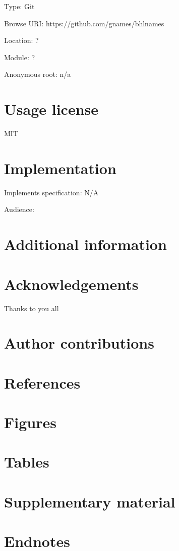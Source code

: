 \documentclass[
]{article}
\begin{document}
Type: Git

Browse URI: https://github.com/gnames/bhlnames

Location: ?

Module: ?

Anonymous root: n/a

\hypertarget{usage-license}{%
\section{Usage license}\label{usage-license}}

MIT

\hypertarget{implementation}{%
\section{Implementation}\label{implementation}}

Implements specification: N/A

Audience:

\hypertarget{additional-information}{%
\section{Additional information}\label{additional-information}}

\hypertarget{acknowledgements}{%
\section{Acknowledgements}\label{acknowledgements}}

Thanks to you all

\hypertarget{author-contributions}{%
\section{Author contributions}\label{author-contributions}}

\hypertarget{references}{%
\section{References}\label{references}}

\hypertarget{figures}{%
\section{Figures}\label{figures}}

\hypertarget{tables}{%
\section{Tables}\label{tables}}

\hypertarget{supplementary-material}{%
\section{Supplementary material}\label{supplementary-material}}

\hypertarget{endnotes}{%
\section{Endnotes}\label{endnotes}}
\end{document}
